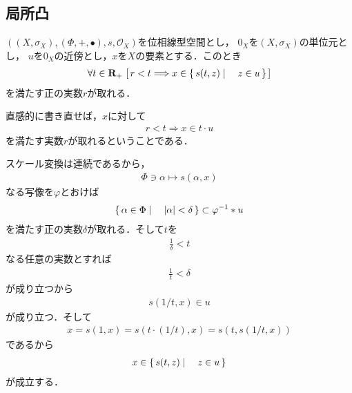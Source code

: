 \subsection{局所凸}
	\begin{screen}
		\begin{thm}[ゼロの近傍をスケール変換すれば空間全体を覆うことが出来る]
		\label{thm:neighbor_of_zero_is_absorbing}
			$\left(\left(X,\sigma_X\right),(\Phi,+,\bullet),s,\mathscr{O}_X\right)$を位相線型空間とし，
			$0_X$を$\left(X,\sigma_X\right)$の単位元とし，
			$u$を$0_X$の近傍とし，$x$を$X$の要素とする．このとき
			\begin{align}
				\forall t \in \mathbf{R}_+\,
				\left[\, r < t \Longrightarrow x \in \left\{\, s(t,z) \mid \quad z \in u\, \right\}\, \right]
			\end{align}
			を満たす正の実数$r$が取れる．
		\end{thm}
	\end{screen}
	
	直感的に書き直せば，$x$に対して
	\begin{align}
		r < t \Longrightarrow x \in t \cdot u
	\end{align}
	を満たす実数$r$が取れるということである．
	
	\begin{sketch}
		スケール変換は連続であるから，
		\begin{align}
			\Phi \ni \alpha \longmapsto s(\alpha,x)
		\end{align}
		なる写像を$\varphi$とおけば
		\begin{align}
			\left\{\, \alpha \in \Phi \mid \quad |\alpha| < \delta\, \right\} \subset \varphi^{-1} \ast u
		\end{align}
		を満たす正の実数$\delta$が取れる．そして$t$を
		\begin{align}
			\frac{1}{\delta} < t
		\end{align}
		なる任意の実数とすれば
		\begin{align}
			\frac{1}{t} < \delta
		\end{align}
		が成り立つから
		\begin{align}
			s(1/t,x) \in u
		\end{align}
		が成り立つ．そして
		\begin{align}
			x = s\left(1,x\right) = s\left(t \cdot (1/t),x\right) = s\left(t,s\left(1/t,x\right)\right)
		\end{align}
		であるから
		\begin{align}
			x \in \left\{\, s(t,z) \mid \quad z \in u\, \right\}
		\end{align}
		が成立する．
		\QED
	\end{sketch}
	
